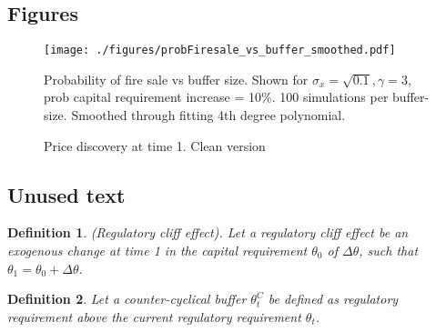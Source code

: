 \documentclass[11pt]{article}
\newtheorem{definition}{Definition}%
\begin{document}
\begin{appendices}
\iffalse
\section{Figures}

\begin{figure}[h]
\centering
\texttt{[image: ./figures/probFiresale\_vs\_buffer\_smoothed.pdf]}
\caption{Probability of fire sale vs buffer size. Shown for $\sigma_x = \sqrt{0.1}, \gamma = 3$, prob capital requirement increase = 10\%. 100 simulations per buffer-size. Smoothed through fitting 4th degree polynomial.}
\label{f_probFSvsBufferAppendix}
\end{figure}

\begin{figure}[h]
\centering
{}
\caption{Price discovery at time 1. Clean version}
\label{fig:t1pricediscClean}
\end{figure}

\newpage
\subsection{Unused text}

\begin{definition} (Regulatory cliff effect).
Let a regulatory cliff effect be an exogenous change at time 1 in the capital requirement $\theta_0$ of $\Delta \theta$, such that $\theta_1 = \theta_0 + \Delta \theta$. 
\end{definition}

\begin{definition}
Let a counter-cyclical buffer $\theta^C_t$ be defined as regulatory requirement above the current regulatory requirement $\theta_t$.
\end{definition}


\end{appendices}
\end{document}
